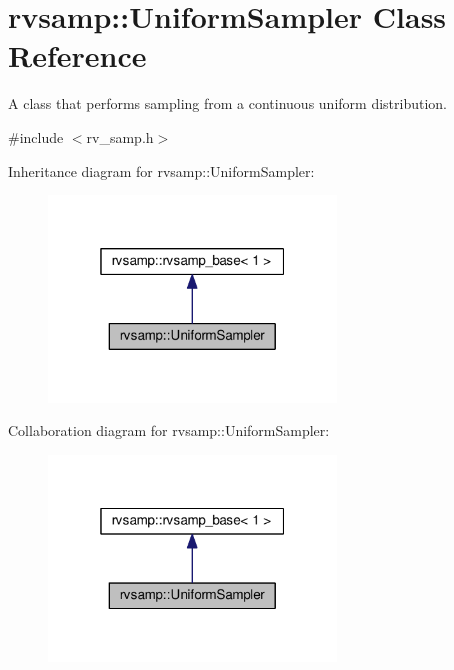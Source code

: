 \hypertarget{classrvsamp_1_1UniformSampler}{}\section{rvsamp\+:\+:Uniform\+Sampler Class Reference}
\label{classrvsamp_1_1UniformSampler}


A class that performs sampling from a continuous uniform distribution.  




{\ttfamily \#include $<$rv\+\_\+samp.\+h$>$}



Inheritance diagram for rvsamp\+:\+:Uniform\+Sampler\+:\nopagebreak
\begin{figure}[H]
\begin{center}
\leavevmode
\includegraphics[width=217pt]{classrvsamp_1_1UniformSampler__inherit__graph}
\end{center}
\end{figure}


Collaboration diagram for rvsamp\+:\+:Uniform\+Sampler\+:\nopagebreak
\begin{figure}[H]
\begin{center}
\leavevmode
\includegraphics[width=217pt]{classrvsamp_1_1UniformSampler__coll__graph}
\end{center}
\end{figure}
